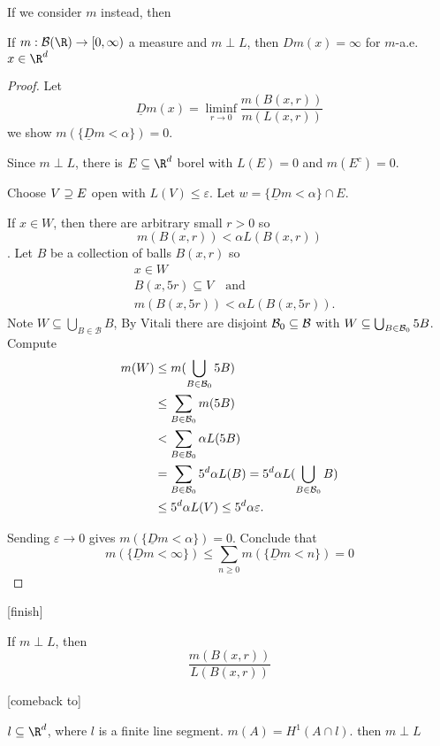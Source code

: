 If we consider $m$ instead, then

\begin{theorem}
	If $m: \mathcal{B}(\R) \to [0,\infty)$ a measure and $m \perp L$, then $D m(x) = \infty$ for  $m$-a.e. $x\in \R^d$
\end{theorem}

\begin{proof}
Let 
\[
	\underline{D} m(x) = \liminf_{r \to 0} \frac{m(B(x,r))}{m(L(x,r))}
\]
we show $m(\{ \underline{D} m < \alpha \}) = 0$.

Since $m \perp L$, there is $E \subseteq \R^d$ borel with $L(E) = 0$ and $m(E^c) = 0$. 

Choose $V \supseteq E$ open with $L(V) \leq \varepsilon$. Let $w = \{ \underline{D} m < \alpha \} \cap E$.

If  $x \in W$, then there are arbitrary small  $r > 0$ so
\[
	m(B(x,r)) < \alpha L(B(x,r))
\]. 
Let $B$ be a collection of balls $B(x,r)$ so 
\begin{align*}
	&x \in W \\
	&B(x,5r) \subseteq V \quad \text{and} \\
	&m(B(x,5r)) < \alpha L(B(x,5r)).
\end{align*}
Note $W \subseteq \bigcup_{B \in \mathcal{B}} B$, By Vitali there are disjoint
$\mathcal{B}_0 \subseteq \mathcal{B}$ with $W \subseteq \bigcup_{B \in \mathcal{B}_{0}} 5B$.
Compute
\begin{align*}
	m(W) &\leq m( \bigcup_{B \in \mathcal{B}_{0}} 5B) \\
		 &\leq \sum_{B \in \mathcal{B}_0} m(5B) \\
		 &< \sum_{B \in \mathcal{B}_{0}} \alpha L(5B) \\
		 &= \sum_{B \in \mathcal{B}_0} 5^d \alpha L(B) = 5^d \alpha L(\bigcup_{B \in \mathcal{B}_0} B) \\
		 &\leq 5^d \alpha L(V) \leq 5^d \alpha \varepsilon.
\end{align*} 

Sending $\varepsilon \to 0$ gives $m(\{ \underline{D} m < \alpha \} ) = 0$.
Conclude that
 \[
	 m(\{ \underline{D} m < \infty\}) \leq \sum_{n \geq 0} m (\{ \underline{D} m < n \} ) = 0
\] 
\end{proof}
[finish]

\begin{remark}
	If $m \perp L$, then 
	\[
		\frac{m(B(x,r))}{L(B(x,r))} 
	\] 
\end{remark}
[comeback to]

\begin{example}
	$l \subseteq \R^d$, where $l$ is a finite line segment. $m(A) = H^1 (A \cap l)$.
	then  $m \perp L$
\end{example}


